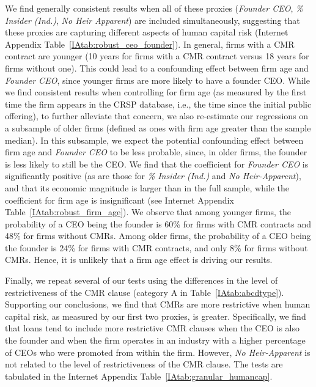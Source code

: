 \documentclass[a4paper,12pt]{article}
\begin{document}
We find generally consistent results when all of these proxies (\textit{Founder CEO}, \textit{\% Insider (Ind.)}, \textit{No Heir Apparent}) are included simultaneously, suggesting that these proxies are capturing different aspects of human capital risk (Internet Appendix Table~\ref{IAtab:robust_ceo_founder}).
In general, firms with a CMR contract are younger (10 years for firms with a CMR contract versus 18 years for firms without one).
This could lead to a confounding effect between firm age and \textit{Founder CEO}, since younger firms are more likely to have a founder CEO.
While we find consistent results when controlling for firm age (as measured by the first time the firm appears in the CRSP database, i.e., the time since the initial public offering), to further alleviate that concern, we also re-estimate our regressions on a subsample of older firms (defined as ones with firm age greater than the sample median).
In this subsample, we expect the potential confounding effect between firm age and \textit{Founder CEO} to be less probable, since, in older firms, the founder is less likely to still be the CEO.
We find that the coefficient for \textit{Founder CEO} is significantly positive (as are those for \textit{\% Insider (Ind.)} and \textit{No Heir-Apparent}), and that its economic magnitude is larger than in the full sample, while the coefficient for firm age is insignificant (see Internet Appendix Table~\ref{IAtab:robust_firm_age}).
We observe that among younger firms, the probability of a CEO being the founder is 60\% for firms with CMR contracts and 48\% for firms without CMRs.
Among older firms, the probability of a CEO being the founder is 24\% for firms with CMR contracts, and only 8\% for firms without CMRs.
Hence, it is unlikely that a firm age effect is driving our results.



Finally, we repeat several of our tests using the differences in the level of restrictiveness of the CMR clause (category A in Table~\ref{IAtab:abcdtype}).
Supporting our conclusions, we find that CMRs are more restrictive when human capital risk, as measured by our first two proxies, is greater.
Specifically, we find that loans tend to include more restrictive CMR clauses when the CEO is also the founder and when the firm operates in an industry with a higher percentage of CEOs who were promoted from within the firm.
However, \textit{No Heir-Apparent} is not related to the level of restrictiveness of the CMR clause.
The tests are tabulated in the Internet Appendix Table~\ref{IAtab:granular_humancap}. 
\end{document}
